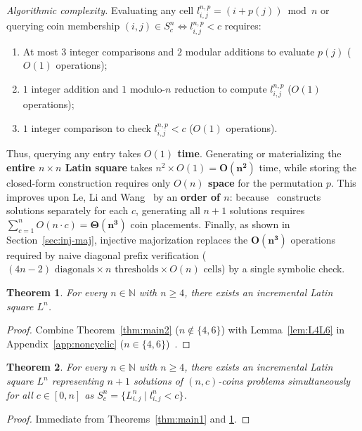 \documentclass[10pt,a4paper]{article}
\newtheorem{theorem}{Theorem}[section]
\theoremstyle{remark}
\begin{document}
\emph{Algorithmic complexity.}
Evaluating any cell $l^{n,p}_{i,j} = (i + p(j)) \bmod n$ or querying coin membership
$(i,j) \in S^n_c \iff l^{n,p}_{i,j} < c$ requires:
\begin{enumerate}[nosep]
  \item At most $3$ integer comparisons and $2$ modular additions to evaluate $p(j)$ ($O(1)$ operations);
  \item $1$ integer addition and $1$ modulo-$n$ reduction to compute $l^{n,p}_{i,j}$ ($O(1)$ operations);
  \item $1$ integer comparison to check $l^{n,p}_{i,j} < c$ ($O(1)$ operations).
\end{enumerate}
Thus, querying any entry takes \textbf{$O(1)$ time}.
Generating or materializing the \textbf{entire $n \!\times\! n$ Latin square} takes $n^2 \times O(1) = \mathbf{O(n^2)}$ time,
while storing the closed-form construction requires only \textbf{$O(n)$ space} for the permutation $p$.
This improves upon Le, Li and Wang~\cite{LLW1990} by an \textbf{order of $n$}: because~\cite{LLW1990}
constructs solutions separately for each $c$, generating all $n+1$ solutions requires
$\sum_{c=1}^n O(n \cdot c) = \mathbf{\Theta(n^3)}$ coin placements.
Finally, as shown in Section~\ref{sec:inj-maj}, injective majorization replaces the $\mathbf{O(n^3)}$
operations required by naive diagonal prefix verification ($(4n - 2) \text{ diagonals} \times n \text{ thresholds} \times O(n) \text{ cells}$)
by a single symbolic check.

\begin{theorem}\label{thm:main3}
For every $n \in \mathbb{N}$ with $n \ge 4$, there exists an \emph{incremental} Latin square $L^n$.
\end{theorem}

\begin{proof}
Combine Theorem~\ref{thm:main2} ($n \notin \{4,6\}$) with Lemma~\ref{lem:L4L6} in
Appendix~\ref{app:noncyclic} ($n \in \{4,6\}$)~\cite{PalomarLean,CompanionRepo}.
\end{proof}

\begin{theorem}\label{thm:main4}
For every $n \in \mathbb{N}$ with $n \ge 4$, there exists an \emph{incremental} Latin square $L^n$
representing $n + 1$ solutions of $(n,c)$-coins problems \emph{simultaneously} for all $c \in [0,n]$
as $S^n_c = \{L^n_{i,j} \mid l^n_{i,j} < c\}$.
\end{theorem}

\begin{proof}
Immediate from Theorems~\ref{thm:main1} and \ref{thm:main3}.
\end{proof}
\end{document}
